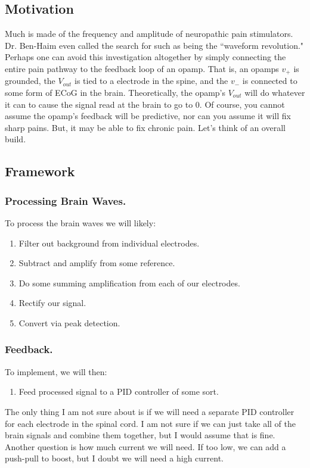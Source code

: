 \documentclass[12pt]{report}
\newcommand{\Vo}{{V}_{out}}
\begin{document}
\subsection{Motivation}
Much is made of the frequency and amplitude of neuropathic pain stimulators. Dr. Ben-Haim even called the search for such as being the ``waveform revolution." Perhaps one can avoid this investigation altogether by simply connecting the entire pain pathway to the feedback loop of an opamp. That is, an opamps $v_+$ is grounded, the $\Vo$ is tied to a electrode in the spine, and the $v_-$ is connected to some form of ECoG in the brain. Theoretically, the opamp's $\Vo$ will do whatever it can to cause the signal read at the brain to go to 0. Of course, you cannot assume the opamp's feedback will be predictive, nor can you assume it will fix sharp pains. But, it may be able to fix chronic pain. Let's think of an overall build. 

\subsection{Framework}

\subsubsection{Processing Brain Waves.}
To process the brain waves we will likely:

\begin{enumerate}
    \item Filter out background from individual electrodes. 
    \item Subtract and amplify from some reference.
    \item Do some summing amplification from each of our electrodes.
    \item Rectify our signal.
    \item Convert via peak detection.
\end{enumerate}

\subsubsection{Feedback.}
To implement, we will then: 

\begin{enumerate}
    \item Feed processed signal to a PID controller of some sort.
\end{enumerate}

The only thing I am not sure about is if we will need a separate PID controller for each electrode in the spinal cord. I am not sure if we can just take all of the brain signals and combine them together, but I would assume that is fine. Another question is how much current we will need. If too low, we can add a push-pull to boost, but I doubt we will need a high current. 
\end{document}
